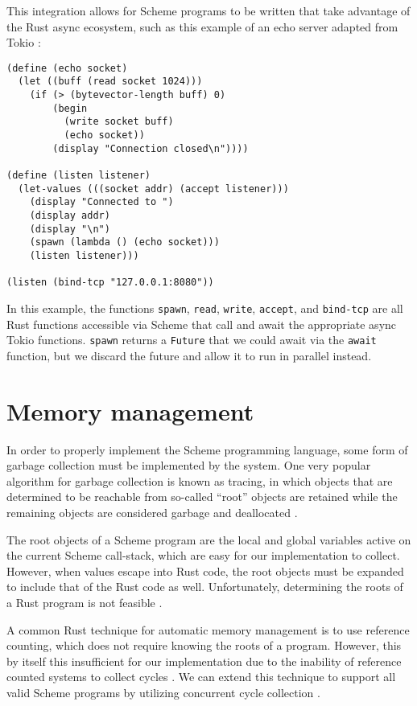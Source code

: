 \documentclass[sigplan]{acmart}
\begin{document}
This integration allows for Scheme programs to be written that take advantage
of the Rust async ecosystem, such as this example of an echo server adapted
from Tokio \cite{tokio}:

\begin{verbatim}
(define (echo socket)
  (let ((buff (read socket 1024)))
    (if (> (bytevector-length buff) 0)
        (begin
          (write socket buff)
          (echo socket))
        (display "Connection closed\n"))))

(define (listen listener)
  (let-values (((socket addr) (accept listener)))
    (display "Connected to ")
    (display addr)
    (display "\n")
    (spawn (lambda () (echo socket)))
    (listen listener)))

(listen (bind-tcp "127.0.0.1:8080"))
\end{verbatim}

In this example, the functions \texttt{spawn}, \texttt{read}, \texttt{write},
\texttt{accept}, and \texttt{bind-tcp} are all Rust functions accessible via
Scheme that call and await the appropriate async Tokio functions. \texttt{spawn}
returns a \texttt{Future} \cite{future} that we could await via the
\texttt{await} function, but we discard the future and allow it to run in
parallel instead. 

\section{Memory management}

In order to properly implement the Scheme programming language, some form of
garbage collection must be implemented by the system. One very popular algorithm
for garbage collection is known as tracing, in which objects that are determined
to be reachable from so-called ``root'' objects are retained while the remaining
objects are considered garbage and deallocated \cite{lisptracing}.

The root objects of a Scheme program are the local and global variables active on
the current Scheme call-stack, which are easy for our implementation to collect.
However, when values escape into Rust code, the root objects must be expanded to
include that of the Rust code as well. Unfortunately, determining the roots of a
Rust program is not feasible \cite{rusttracing}.

A common Rust technique for automatic memory management is to use reference
counting, which does not require knowing the roots of a program. However, this
by itself this insufficient for our implementation due to the inability of
reference counted systems to collect cycles \cite{rc}. We can extend this
technique to support all valid Scheme programs by utilizing concurrent cycle
collection \cite{cc}.
\end{document}
